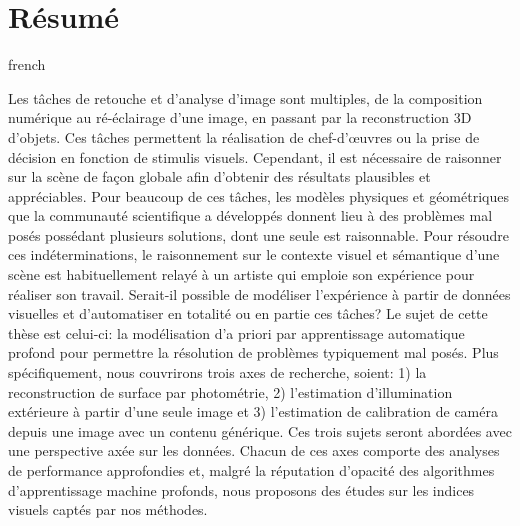 \chapter*{Résumé}                      %

\begin{otherlanguage*}{french}

Les tâches de retouche et d'analyse d'image sont multiples, de la composition numérique au ré-éclairage d'une image, en passant par la reconstruction 3D d'objets. Ces tâches permettent la réalisation de chef-d'\oe{}uvres ou la prise de décision en fonction de stimulis visuels. Cependant, il est nécessaire de raisonner sur la scène de façon globale afin d'obtenir des résultats plausibles et appréciables. Pour beaucoup de ces tâches, les modèles physiques et géométriques que la communauté scientifique a développés donnent lieu à des problèmes mal posés possédant plusieurs solutions, dont une seule est raisonnable. Pour résoudre ces indéterminations, le raisonnement sur le contexte visuel et sémantique d'une scène est habituellement relayé à un artiste qui emploie son expérience pour réaliser son travail. Serait-il possible de modéliser l'expérience à partir de données visuelles et d'automatiser en totalité ou en partie ces tâches? Le sujet de cette thèse est celui-ci: la modélisation d'a priori par apprentissage automatique profond pour permettre la résolution de problèmes typiquement mal posés. Plus spécifiquement, nous couvrirons trois axes de recherche, soient: 1) la reconstruction de surface par photométrie, 2) l'estimation d'illumination extérieure à partir d'une seule image et 3) l'estimation de calibration de caméra depuis une image avec un contenu générique. Ces trois sujets seront abordées avec une perspective axée sur les données. Chacun de ces axes comporte des analyses de performance approfondies et, malgré la réputation d'opacité des algorithmes d'apprentissage machine profonds, nous proposons des études sur les indices visuels captés par nos méthodes.

\end{otherlanguage*}
